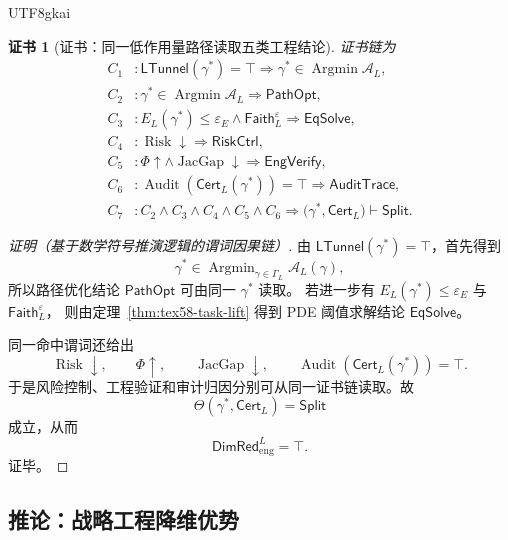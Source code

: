 \documentclass[12pt]{article}
\newtheorem{Certificate}{证书}[section]
\DeclareMathOperator{\Audit}{Audit}
\DeclareMathOperator{\JacGap}{JacGap}
\DeclareMathOperator{\Risk}{Risk}
\DeclareMathOperator*{\Argmin}{Argmin}
\begin{document}
\begin{CJK*}{UTF8}{gkai}
\begin{Certificate}[证书：同一低作用量路径读取五类工程结论]
\label{cert:tex58-engineering-compression}
证书链为
\[
\begin{aligned}
  C_1 &: \mathsf{LTunnel}(\gamma^\ast)=\top
         \Rightarrow
         \gamma^\ast\in\Argmin\mathcal A_L,\\
  C_2 &: \gamma^\ast\in\Argmin\mathcal A_L
         \Rightarrow
         \mathsf{PathOpt},\\
  C_3 &: E_L(\gamma^\ast)\le\varepsilon_E
         \wedge
         \mathsf{Faith}_L^{\varepsilon}
         \Rightarrow
         \mathsf{EqSolve},\\
  C_4 &: \Risk\downarrow\Rightarrow\mathsf{RiskCtrl},\\
  C_5 &: \Phi\uparrow\wedge\JacGap\downarrow
         \Rightarrow
         \mathsf{EngVerify},\\
  C_6 &: \Audit(\mathsf{Cert}_L(\gamma^\ast))=\top
         \Rightarrow
         \mathsf{AuditTrace},\\
  C_7 &: C_2\wedge C_3\wedge C_4\wedge C_5\wedge C_6
         \Rightarrow
         \bigl(\gamma^\ast,\mathsf{Cert}_L\bigr)\vdash\mathsf{Split}.
\end{aligned}
\]
\end{Certificate}

\begin{proof}[证明（基于数学符号推演逻辑的谓词因果链）]
由 \(\mathsf{LTunnel}(\gamma^\ast)=\top\)，首先得到
\[
  \gamma^\ast\in\Argmin_{\gamma\in\Gamma_L}\mathcal A_L(\gamma),
\]
所以路径优化结论 \(\mathsf{PathOpt}\) 可由同一 \(\gamma^\ast\) 读取。
若进一步有 \(E_L(\gamma^\ast)\le\varepsilon_E\) 与 \(\mathsf{Faith}_L^{\varepsilon}\)，
则由定理~\ref{thm:tex58-task-lift} 得到 PDE 阈值求解结论 \(\mathsf{EqSolve}\)。

同一命中谓词还给出
\[
  \Risk\downarrow,
  \qquad
  \Phi\uparrow,
  \qquad
  \JacGap\downarrow,
  \qquad
  \Audit(\mathsf{Cert}_L(\gamma^\ast))=\top.
\]
于是风险控制、工程验证和审计归因分别可从同一证书链读取。故
\[
  \Theta(\gamma^\ast,\mathsf{Cert}_L)
  =
  \mathsf{Split}
\]
成立，从而
\[
  \mathsf{DimRed}_{\mathrm{eng}}^L=\top.
\]
证毕。
\end{proof}

\subsection{推论：战略工程降维优势}
\label{subsec:tex58-strategic-dimred-corollary}


\end{CJK*}
\end{document}
